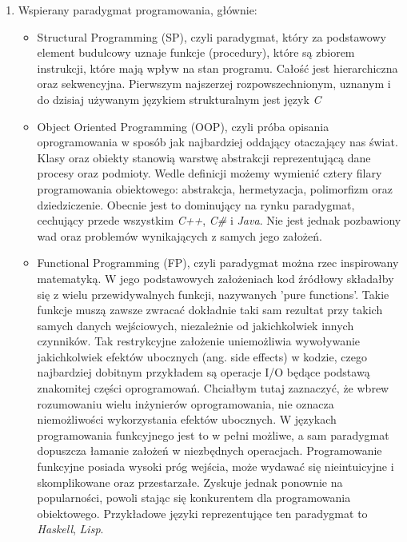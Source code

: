 \documentclass[skorowidz,skroty]{dyplomWEZUT}
\begin{document}
\begin{enumerate}
\item Wspierany paradygmat programowania, głównie:
\begin{itemize}
	\item Structural Programming (SP), czyli paradygmat, który za podstawowy element budulcowy uznaje funkcje (procedury), które są zbiorem instrukcji, które mają wpływ na stan programu. Całość jest hierarchiczna oraz sekwencyjna. Pierwszym najszerzej rozpowszechnionym, uznanym i do dzisiaj używanym językiem strukturalnym jest język \textit{C}
	\item Object Oriented Programming (OOP), czyli próba opisania oprogramowania w sposób jak najbardziej oddający otaczający nas świat. Klasy oraz obiekty stanowią warstwę abstrakcji reprezentującą dane procesy oraz podmioty. Wedle definicji możemy wymienić cztery filary programowania obiektowego: abstrakcja, hermetyzacja, polimorfizm oraz dziedziczenie. Obecnie jest to dominujący na rynku paradygmat, cechujący przede wszystkim \textit{C++}, \textit{C\#} i \textit{Java}. Nie jest jednak pozbawiony wad oraz problemów wynikających z samych jego założeń. 
	\item Functional Programming (FP), czyli paradygmat można rzec inspirowany matematyką. W jego podstawowych założeniach kod źródłowy składałby się z wielu przewidywalnych funkcji, nazywanych 'pure functions'. Takie funkcje muszą zawsze zwracać dokładnie taki sam rezultat przy takich samych danych wejściowych, niezależnie od jakichkolwiek innych czynników. Tak restrykcyjne założenie uniemożliwia wywoływanie jakichkolwiek efektów ubocznych (ang. side effects) w kodzie, czego najbardziej dobitnym przykładem są operacje I/O będące podstawą znakomitej części oprogramowań. Chciałbym tutaj zaznaczyć, że wbrew rozumowaniu wielu inżynierów oprogramowania, nie oznacza niemożliwości wykorzystania efektów ubocznych. W językach programowania funkcyjnego jest to w pełni możliwe, a sam paradygmat dopuszcza łamanie założeń w niezbędnych operacjach. Programowanie funkcyjne posiada wysoki próg wejścia, może wydawać się nieintuicyjne i skomplikowane oraz przestarzałe. Zyskuje jednak ponownie na popularności, powoli stając się konkurentem dla programowania obiektowego. Przykładowe języki reprezentujące ten paradygmat to \textit{Haskell}, \textit{Lisp}.
\end{itemize}  


\end{enumerate}
\end{document}
